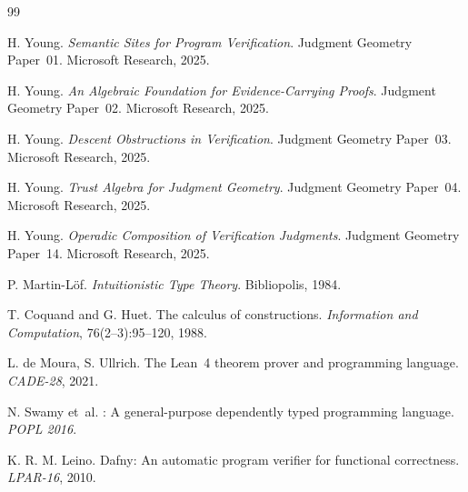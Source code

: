 \documentclass[11pt]{article}
\begin{document}
\begin{thebibliography}{99}

H. Young.
\textit{Semantic Sites for Program Verification}.
Judgment Geometry Paper~01. Microsoft Research, 2025.

H. Young.
\textit{An Algebraic Foundation for Evidence-Carrying Proofs}.
Judgment Geometry Paper~02. Microsoft Research, 2025.

H. Young.
\textit{Descent Obstructions in Verification}.
Judgment Geometry Paper~03. Microsoft Research, 2025.

H. Young.
\textit{Trust Algebra for Judgment Geometry}.
Judgment Geometry Paper~04. Microsoft Research, 2025.

H. Young.
\textit{Operadic Composition of Verification Judgments}.
Judgment Geometry Paper~14. Microsoft Research, 2025.

P. Martin-L\"of.
\textit{Intuitionistic Type Theory}.
Bibliopolis, 1984.

T. Coquand and G. Huet.
The calculus of constructions.
\textit{Information and Computation}, 76(2--3):95--120, 1988.

L. de Moura, S. Ullrich.
The Lean~4 theorem prover and programming language.
\textit{CADE-28}, 2021.

N. Swamy et~al.
\Fstar{}: A general-purpose dependently typed programming language.
\textit{POPL 2016}.

K. R. M. Leino.
Dafny: An automatic program verifier for functional correctness.
\textit{LPAR-16}, 2010.

\end{thebibliography}
\end{document}
